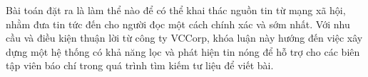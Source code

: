 Bài toán đặt ra là làm thể nào để có thể khai thác nguồn tin từ mạng xã hội, nhằm đưa tin tức đến cho người đọc một cách chính xác và sớm nhất. Với nhu cầu và điều kiện thuận lời từ công ty VCCorp, khóa luận này hướng đến việc xây dựng một hệ thống có khả năng lọc và phát hiện tin nóng để hỗ trợ cho các biên tập viên báo chí trong quá trình tìm kiếm tư liệu để viết bài.

%
%
%
%

